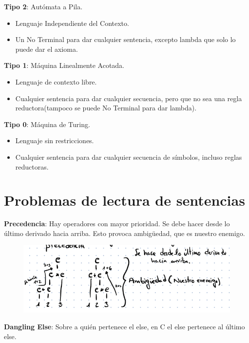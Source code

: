 \documentclass[12pt, twoside, openright]{report} %
\begin{document}
\textbf{Tipo 2}: Autómata a Pila.

\begin{itemize}
\item
  Lenguaje Independiente del Contexto.
\item
  Un No Terminal para dar cualquier sentencia, excepto lambda que solo
  lo puede dar el axioma.
\end{itemize}

\textbf{Tipo 1}: Máquina Linealmente Acotada.

\begin{itemize}
\item
  Lenguaje de contexto libre.
\item
  Cualquier sentencia para dar cualquier secuencia, pero que no sea una
  regla reductora(tampoco se puede No Terminal para dar lambda).
\end{itemize}

\textbf{Tipo 0}: Máquina de Turing.

\begin{itemize}
\item
  Lenguaje sin restricciones.
\item
  Cualquier sentencia para dar cualquier secuencia de símbolos, incluso
  reglas reductoras.
\end{itemize}

\section{Problemas de lectura de sentencias}

\textbf{Precedencia}: Hay operadores con mayor prioridad. Se debe hacer
desde lo último derivado hacia arriba. Esto provoca ambigüedad, que es
nuestro enemigo.

\begin{figure}[H]
	{\includegraphics[scale=.4]{Untitled.png}}
\end{figure}

\textbf{Dangling Else}: Sobre a quién pertenece el else, en C el else
pertenece al último else.
\end{document}
